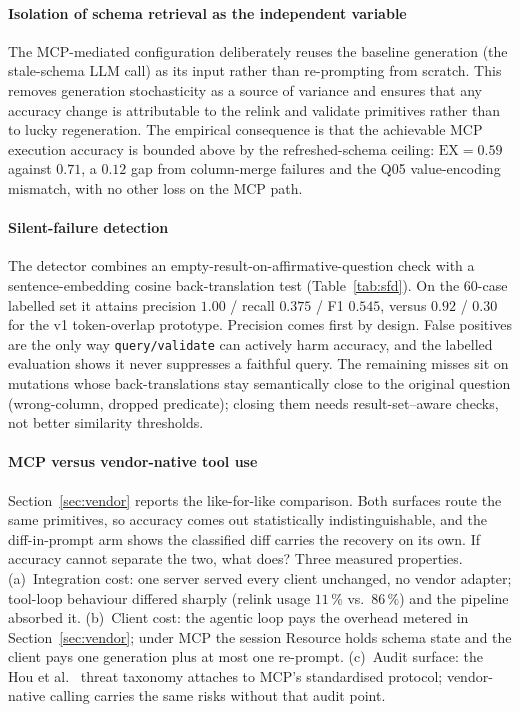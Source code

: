 \documentclass[conference,10pt,a4paper]{IEEEtran}
\begin{document}
\paragraph*{Isolation of schema retrieval as the independent variable}
The MCP-mediated configuration deliberately reuses the baseline
generation (the stale-schema LLM call) as its input rather than
re-prompting from scratch. This removes generation stochasticity as a
source of variance and ensures that any accuracy change is
attributable to the relink and validate primitives rather than to
lucky regeneration. The empirical consequence is that the achievable
MCP execution accuracy is bounded above by the refreshed-schema
ceiling: $\text{EX} = 0.59$ against $0.71$, a $0.12$ gap from
column-merge failures and the Q05 value-encoding mismatch, with no
other loss on the MCP path.

\paragraph*{Silent-failure detection}
The detector combines an empty-result-on-affirmative-question
check with a sentence-embedding cosine back-translation test
(Table~\ref{tab:sfd}). On the 60-case labelled set it attains
precision $1.00$ / recall $0.375$ / F1 $0.545$, versus $0.92$ / $0.30$
for the v1 token-overlap prototype. Precision comes first by design.
False positives are the only way \texttt{query/validate} can actively
harm accuracy, and the labelled evaluation shows it never suppresses a
faithful query. The remaining misses sit on mutations whose
back-translations stay semantically close to the original question
(wrong-column, dropped predicate); closing them needs
result-set--aware checks, not better similarity thresholds.

\paragraph*{MCP versus vendor-native tool use}
Section~\ref{sec:vendor} reports the like-for-like comparison. Both
surfaces route the same primitives, so accuracy comes out
statistically indistinguishable, and the diff-in-prompt arm shows the
classified diff carries the recovery on its own. If accuracy cannot
separate the two, what does? Three measured properties.
(a)~Integration cost: one server served every client unchanged, no
vendor adapter; tool-loop behaviour differed sharply (relink usage
$11\,\%$ vs.\ $86\,\%$) and the pipeline absorbed it. (b)~Client
cost: the agentic loop pays the overhead metered in
Section~\ref{sec:vendor}; under MCP the session Resource holds schema
state and the client pays one generation plus at most one re-prompt.
(c)~Audit surface: the Hou et al.~\cite{hou2025mcp} threat taxonomy
attaches to MCP's standardised protocol; vendor-native calling carries
the same risks without that audit point.
\end{document}
